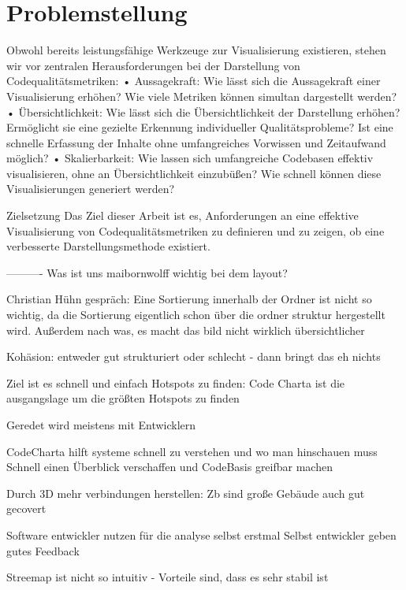 \section{Problemstellung} \label{sec:Problemstellung}

Obwohl bereits leistungsfähige Werkzeuge zur Visualisierung existieren, stehen wir vor
zentralen Herausforderungen bei der Darstellung von Codequalitätsmetriken:
• Aussagekraft: Wie lässt sich die Aussagekraft einer Visualisierung erhöhen? Wie
viele Metriken können simultan dargestellt werden?
• Übersichtlichkeit: Wie lässt sich die Übersichtlichkeit der Darstellung erhöhen?
Ermöglicht sie eine gezielte Erkennung individueller Qualitätsprobleme? Ist eine
schnelle Erfassung der Inhalte ohne umfangreiches Vorwissen und Zeitaufwand
möglich?
• Skalierbarkeit: Wie lassen sich umfangreiche Codebasen effektiv visualisieren,
ohne an Übersichtlichkeit einzubüßen? Wie schnell können diese
Visualisierungen generiert werden?

Zielsetzung
Das Ziel dieser Arbeit ist es, Anforderungen an eine effektive Visualisierung von
Codequalitätsmetriken zu definieren und zu zeigen, ob eine verbesserte
Darstellungsmethode existiert.



----------
Was ist uns maibornwolff wichtig bei dem layout?


Christian Hühn gespräch:
Eine Sortierung innerhalb der Ordner ist nicht so wichtig, da die Sortierung eigentlich schon über die ordner struktur hergestellt wird. Außerdem nach was, es macht das bild nicht wirklich übersichtlicher

Kohäsion: entweder gut strukturiert oder schlecht - dann bringt das eh nichts



Ziel ist es schnell und einfach Hotspots zu finden:
Code Charta ist die ausgangslage um die größten Hotspots zu finden

Geredet wird meistens mit Entwicklern

CodeCharta hilft systeme schnell zu verstehen und wo man hinschauen muss
Schnell einen Überblick verschaffen und CodeBasis greifbar machen

Durch 3D mehr verbindungen herstellen: Zb sind große Gebäude auch gut gecovert



Software entwickler nutzen für die analyse selbst erstmal 
Selbst entwickler geben gutes Feedback


Streemap ist nicht so intuitiv - Vorteile sind, dass es sehr stabil ist




